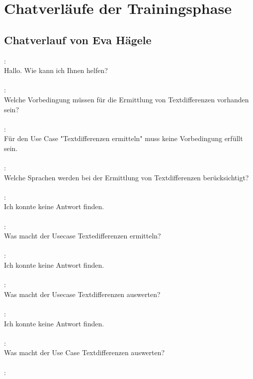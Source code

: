 \chapter{Chatverläufe der Trainingsphase}
\label{ch:chatverlaeufe}
\section{Chatverlauf von Eva Hägele}
\label{ch:chatverlaeufe:eva}
\speaker{\Chatbot}: \\
Hallo. Wie kann ich Ihnen helfen? \\\\
\speaker{\EvaHaegele}: \\
Welche Vorbedingung müssen für die Ermittlung von Textdifferenzen vorhanden sein? \\\\
\speaker{\Chatbot}: \\
Für den Use Case "Textdifferenzen ermitteln" muss keine Vorbedingung erfüllt sein. \\\\
\speaker{\EvaHaegele}: \\
Welche Sprachen werden bei der Ermittlung von Textdifferenzen berücksichtigt? \\\\
\speaker{\Chatbot}: \\
Ich konnte keine Antwort finden. \\\\
\speaker{\EvaHaegele}: \\
Was macht der Usecase Textedifferenzen ermitteln? \\\\
\speaker{\Chatbot}: \\
Ich konnte keine Antwort finden. \\\\
\speaker{\EvaHaegele}: \\
Was macht der Usecase Textdifferenzen auswerten? \\\\
\speaker{\Chatbot}: \\
Ich konnte keine Antwort finden. \\\\
\speaker{\EvaHaegele}: \\
Was macht der Use Case Textdifferenzen auswerten? \\\\
\speaker{\Chatbot}: \\
